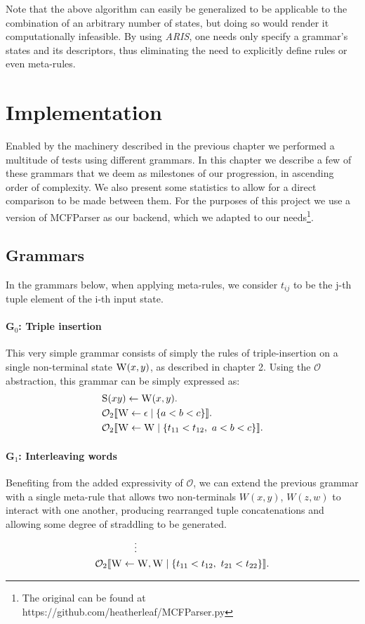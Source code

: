 \documentclass[nonatbib,numbers,10pt]{llncs}
\newcommand\s{\textsc}
\newcommand{\Orderr}[5]{
	\mathcal{#1}_{#5}\llbracket #2 \leftarrow #3 \mid \{ #4 \} \rrbracket.
}
\newcommand{\Or}[4]{\Orderr{O}{#1}{#2}{#3}{#4}}
\begin{document}
Note that the above algorithm can easily be generalized to be applicable to the combination of an arbitrary number of states, but doing so would render it computationally infeasible. By using \textit{ARIS}, one needs only specify a grammar's states and its descriptors, thus eliminating the need to explicitly define rules or even meta-rules.

\section{Implementation}\label{sec3}
Enabled by the machinery described in the previous chapter we performed a multitude of tests using different grammars. In this chapter we describe a few of these grammars that we deem as milestones of our progression, in ascending order of complexity. We also present some statistics to allow for a direct comparison to be made between them. For the purposes of this project we use a version of MCFParser \cite{ljunglof} as our backend, which we adapted to our needs\footnote{The original can be found at https://github.com/heatherleaf/MCFParser.py}.
\subsection{Grammars}
In the grammars below, when applying meta-rules, we consider $t_{ij}$ to be the j-th tuple element of the i-th input state.
\paragraph{G$_0$: Triple insertion}
This very simple grammar consists of simply the rules of triple-insertion on a single non-terminal state $\s{W}(x,y)$, as described in chapter 2. Using the $\mathcal{O}$ abstraction, this grammar can be simply expressed as:
\begin{align*}
&\s{S}(xy) \leftarrow \s{W}(x,y). \\
&\Or{\s{W}}{\epsilon}{a < b < c}{2} \\
&\Or{\s{W}}{\s{W}}{t_{11} < t_{12},\ a < b < c}{2}
\end{align*}
\paragraph{G$_1$: Interleaving words}
Benefiting from the added expressivity of $\mathcal{O}$, we can extend the previous grammar with a single meta-rule that allows two non-terminals $W(x,y)$, $W(z,w)$ to interact with one another, producing rearranged tuple concatenations and allowing some degree of straddling to be generated.
\vspace{-\topsep}
\begin{align*}
& \quad\quad\quad\quad \vdots \\
&\Or{\s{W}}{\s{W}, \s{W}}{t_{11} < t_{12},\ t_{21} < t_{22}}{2}
\end{align*}
\end{document}
